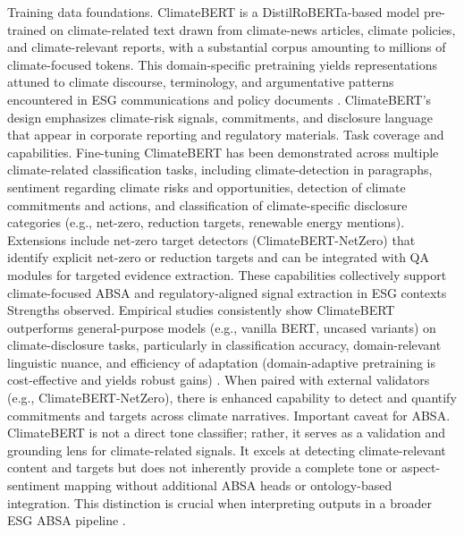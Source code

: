Training data foundations. ClimateBERT is a DistilRoBERTa-based model pre-trained on climate-related text drawn from climate-news articles, climate policies, and climate-relevant reports, with a substantial corpus amounting to millions of climate-focused tokens. This domain-specific pretraining yields representations attuned to climate discourse, terminology, and argumentative patterns encountered in ESG communications and policy documents \cite{10.1145/3630106.3658966,10.48550/arxiv.2108.01415,10.3390/su15053919} . ClimateBERT’s design emphasizes climate-risk signals, commitments, and disclosure language that appear in corporate reporting and regulatory materials.
Task coverage and capabilities. Fine-tuning ClimateBERT has been demonstrated across multiple climate-related classification tasks, including climate-detection in paragraphs, sentiment regarding climate risks and opportunities, detection of climate commitments and actions, and classification of climate-specific disclosure categories (e.g., net-zero, reduction targets, renewable energy mentions). Extensions include net-zero target detectors (ClimateBERT-NetZero) that identify explicit net-zero or reduction targets and can be integrated with QA modules for targeted evidence extraction. These capabilities collectively support climate-focused ABSA and regulatory-aligned signal extraction in ESG contexts \cite{10.18653/v1/2023.emnlp-main.975,10.1371/journal.pone.0288052,10.48550/arxiv.2511.00024}
Strengths observed. Empirical studies consistently show ClimateBERT outperforms general-purpose models (e.g., vanilla BERT, uncased variants) on climate-disclosure tasks, particularly in classification accuracy, domain-relevant linguistic nuance, and efficiency of adaptation (domain-adaptive pretraining is cost-effective and yields robust gains) \cite{10.3390/su15053919,10.1371/journal.pone.0288052,10.48550/arxiv.2511.00024,10.48550/arxiv.2108.01415,10.1145/3630106.3658966}. When paired with external validators (e.g., ClimateBERT-NetZero), there is enhanced capability to detect and quantify commitments and targets across climate narratives.
Important caveat for ABSA. ClimateBERT is not a direct tone classifier; rather, it serves as a validation and grounding lens for climate-related signals. It excels at detecting climate-relevant content and targets but does not inherently provide a complete tone or aspect-sentiment mapping without additional ABSA heads or ontology-based integration. This distinction is crucial when interpreting outputs in a broader ESG ABSA pipeline \cite{10.18653/v1/2023.emnlp-main.975,10.1371/journal.pone.0288052,10.48550/arxiv.2511.00024} .
